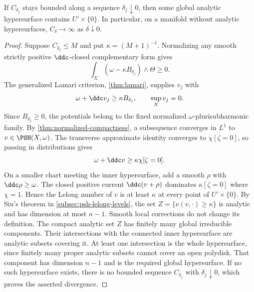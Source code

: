 \begin{theorem}\label{draft:597-divisor-free-concentration}
If $C_{\delta_j}$ stays bounded along a sequence $\delta_j\downarrow0$, then some global analytic hypersurface contains $U'\times\{0\}$. In particular, on a manifold without analytic hypersurfaces, $C_\delta\to\infty$ as $\delta\downarrow0$.
\end{theorem}
\begin{proof}
Suppose $C_{\delta_j}\leq M$ and put $\kappa=(M+1)^{-1}$. Normalizing any smooth strictly positive $\ddc$-closed complementary form gives
\[
 \int_X(\omega-\kappa B_{\delta_j})\wedge\Theta\geq0.
\]
The generalized Lamari criterion, \cref{thm:lamari}, supplies $v_j$ with
\[
 \omega+\ddc v_j\geq\kappa B_{\delta_j},\qquad\sup_Xv_j=0.
\]
Since $B_{\delta_j}\geq0$, the potentials belong to the fixed normalized $\omega$-plurisubharmonic family. By \cref{thm:normalized-compactness}, a subsequence converges in $L^1$ to $v\in\PSH(X,\omega)$.
The transverse approximate identity converges to $\chi[\zeta=0]$, so passing in distributions gives
\[
 \omega+\ddc v\geq\kappa\chi[\zeta=0].
\]
On a smaller chart meeting the inner hypersurface, add a smooth $\rho$ with $\ddc\rho\geq\omega$. The closed positive current $\ddc(v+\rho)$ dominates $\kappa[\zeta=0]$ where $\chi=1$. Hence the Lelong number of $v$ is at least $\kappa$ at every point of $U'\times\{0\}$.
By Siu's theorem in \cref{subsec:psh-lelong-levels}, the set $Z=\{\nu(v,\cdot)\geq\kappa\}$ is analytic and has dimension at most $n-1$. Smooth local corrections do not change its definition. The compact analytic set $Z$ has finitely many global irreducible components. Their intersections with the connected inner hypersurface are analytic subsets covering it. At least one intersection is the whole hypersurface, since finitely many proper analytic subsets cannot cover an open polydisk. That component has dimension $n-1$ and is the required global hypersurface.
If no such hypersurface exists, there is no bounded sequence $C_{\delta_j}$ with $\delta_j\downarrow0$, which proves the asserted divergence.
\end{proof}

